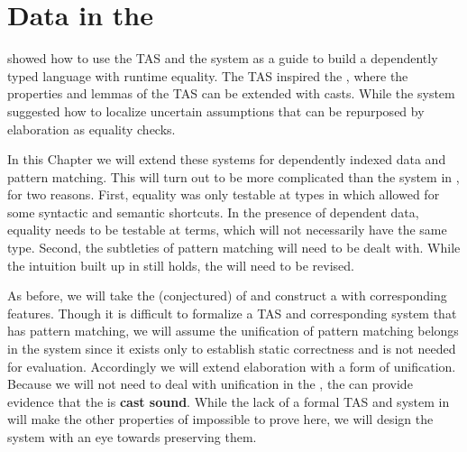 \chapter{Data in the \CLang{}}
\label{chapter:CastData}
\thispagestyle{myheadings}
 
 showed how to use the \ac{TAS} and the \bidir{} system as a guide to build a dependently typed language with runtime equality.
The \ac{TAS} inspired the \csys{}, where the properties and lemmas of the \ac{TAS} can be extended with casts.
While the \bidir{} system suggested how to localize uncertain assumptions that can be repurposed by elaboration as equality checks.
 
In this Chapter we will extend these systems for dependently indexed data and pattern matching.
This will turn out to be more complicated than the system in , for two reasons.
First, equality was only testable at types in  which allowed for some syntactic and semantic shortcuts.
In the presence of dependent data, equality needs to be testable at terms, which will not necessarily have the same type.
Second, the subtleties of pattern matching will need to be dealt with.
While the intuition built up in  still holds, the \clang{} will need to be revised.

As before, we will take the (conjectured) \slang{} of  and construct a \clang{} with corresponding features.
Though it is difficult to formalize a \ac{TAS} and corresponding \bidir{} system that has pattern matching, we will assume the unification of pattern matching belongs in the \bidir{} system since it exists only to establish static correctness and is not needed for evaluation.
Accordingly we will extend elaboration with a form of unification.
Because we will not need to deal with unification in the \clang{}, the \clang{} can provide evidence that the \csys{} is \textbf{cast sound}. 
While the lack of a formal \ac{TAS} and \bidir{} system in  will make the other properties of  impossible to prove here, we will design the system with an eye towards preserving them.


